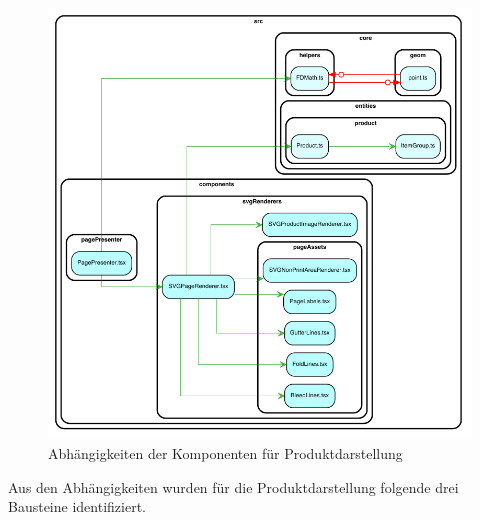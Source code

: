 
\begin{figure}[H]
    \centering
    \includegraphics{diagrams/Ist-Architektur/page-presenter-analysis.pdf}
    \caption{Abhängigkeiten der Komponenten für Produktdarstellung}
    \label{fig:Produktdarstellung}
\end{figure}

Aus den Abhängigkeiten wurden für die Produktdarstellung folgende drei Bausteine identifiziert.
\begin{multicols}{3}
    
\end{multicols}